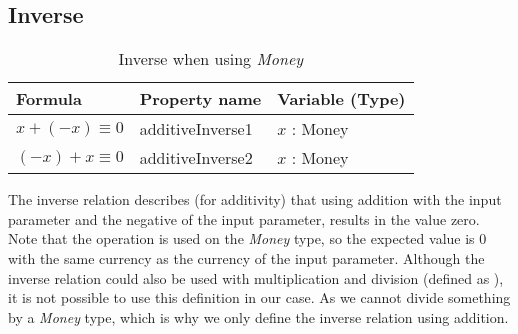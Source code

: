 \subsection*{Inverse}
\label{ssct:properties_inverse}
\begin{table}[!ht]
\centering
\begin{tabular}{lll}
\hline
                        \textbf{Formula}    & \textbf{Property name} & \textbf{Variable (Type)} \\ \hline
\rowcolor[HTML]{EFEFEF} $x + (-x) \equiv 0$ & additiveInverse1       & $x$ : Money              \\
                        $(-x) + x \equiv 0$ & additiveInverse2       & $x$ : Money              \\ \hline
\end{tabular}
\caption{Inverse when using \textit{Money}}
\label{tbl:ch4_money_inverse}
\end{table}
\FloatBarrier\noindent
The inverse relation describes (for additivity) that using addition with the
input parameter and the negative of the input parameter, results in the value
zero. Note that the operation is used on the \textit{Money} type, so the
expected value is 0 with the same currency as the currency of the input
parameter. Although the inverse relation could also be used with multiplication
and division (defined as ), it is not possible to use this
definition in our case. As we cannot divide something by a \textit{Money}
type, which is why we only define the inverse relation using addition.

